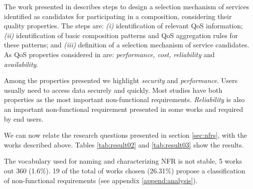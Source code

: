 The work presented in \cite{ThissenW06} describes
steps to design a selection mechanism of services identified as candidates for
participating in a composition, considering their quality properties. The steps
are: \textit{(i)} identification of relevant QoS information; \textit{(ii)} identification of basic composition patterns and
QoS aggregation rules for these patterns; and \textit{(iii)} definition of a
selection mechanism of service candidates. As QoS properties considered in
\cite{ThissenW06} are: \textit{performance, cost, reliability} and
\textit{availability}. 
  

Among the properties presented we highlight \textit{security}
and \textit{performance}. Users usually need to access data
securely and quickly. Most studies have both properties as the most
important non-functional requirements. \textit{Reliability} is also an important
non-functional requirement presented in some works and required by end users.

We can now relate the research questions presented in section \ref{sec:nfrs},
with the works described above. Tables \ref{tab:result02} and \ref{tab:result03}
show the results.

The vocabulary used for naming and characterizing NFR is not stable, 5 works out
360 (1.6\%). 19 of the total of works chosen (26.31\%) propose a
classification of non-functional requirements (see appendix
\ref{append:analysis}).



